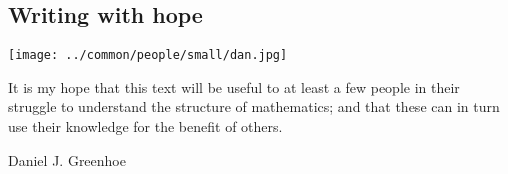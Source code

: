 \begin{personal}
%
%
%  
  
  
\section*{Writing with hope}
\parbox{2\tw/16}{%
  \texttt{[image: ../common/people/small/dan.jpg]}
  }%
\hfill
\parbox{13\tw/16}{%
  It is my hope that this text will be useful to at least a few people
  in their struggle to understand the structure of mathematics;
  and that these can in turn use their knowledge for the benefit of others.

  \textcolor{signature}{Daniel J. Greenhoe }
  }
 


\end{personal}